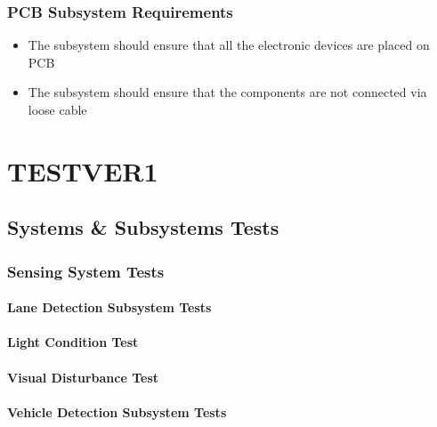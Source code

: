 \documentclass[a4paper,12pt]{article}
\begin{document}
		\subsubsection{PCB Subsystem Requirements}
	
			\begin{itemize}
				\item The subsystem should ensure that all the electronic devices are placed on PCB
				\item The subsystem should ensure that the components are not connected via loose cable 	
			\end{itemize}	

		
	
	\newpage
\section{TESTVER1}




	\subsection{Systems \& Subsystems Tests}	
	

	\subsubsection{Sensing System Tests}
	
		

	\paragraph{Lane Detection Subsystem Tests}	
	
		\paragraph{Light Condition Test}
		
		\paragraph{Visual Disturbance Test}
		
		\paragraph{}
	 
	 
	\paragraph{Vehicle Detection Subsystem Tests}
	
\end{document}

